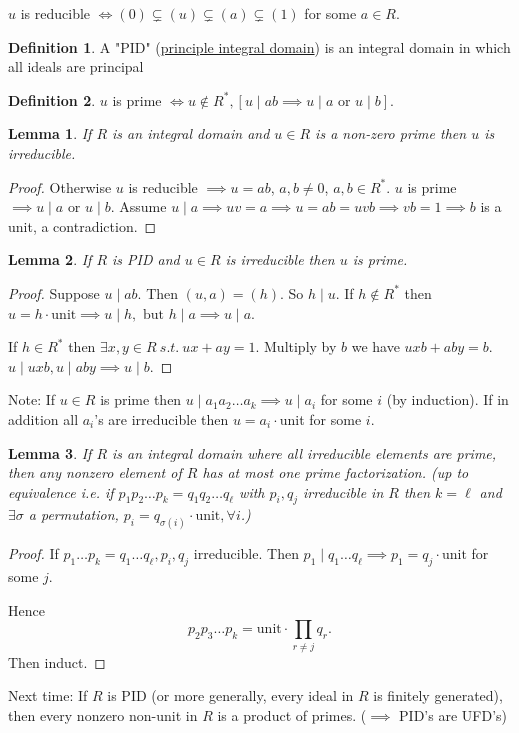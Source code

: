 \documentclass{article}
\newcommand{\st}{\ s.t.\ }
\newtheorem*{lemma}{Lemma}
\theoremstyle{definition}
\newtheorem*{definition}{Definition}
\theoremstyle{remark}
\begin{document}
$u$ is reducible $\iff (0) \subsetneq (u) \subsetneq (a) \subsetneq (1)$ for some $a \in R$.

\begin{definition}
    A "PID" (\underline{principle integral domain}) is an integral domain in which all ideals are principal
\end{definition}

\begin{definition}
    $u$ is prime $\iff u \notin R^*, \left[u \mid ab \implies u \mid a \text{ or } u \mid b\right]$.
\end{definition}

\begin{lemma}
    If $R$ is an integral domain and $u \in R$ is a non-zero prime then $u$ is irreducible.
\end{lemma}
\begin{proof}
    Otherwise $u$ is reducible $\implies u = ab$, $a, b \neq 0$, $a, b \in R^*$. $u$ is prime $\implies u \mid a \text{ or } u \mid b$. Assume $u \mid a \implies uv = a \implies u = ab = uvb \implies vb = 1 \implies b$ is a unit, a contradiction.
\end{proof}

\begin{lemma}
    If $R$ is PID and $u \in R$ is irreducible then $u$ is prime.
\end{lemma}
\begin{proof}
    Suppose $u \mid ab$. Then $(u, a) = (h)$. So $h \mid u$. If $h \notin R^*$ then $u = h \cdot \text{unit} \implies u \mid h, \text{ but } h \mid a \implies u \mid a$.

    If $h \in R^*$ then $\exists x, y \in R \st ux + ay = 1$. Multiply by $b$ we have $uxb + aby = b$. $u \mid uxb, u \mid aby \implies u \mid b$.
\end{proof}
Note: If $u \in R$ is prime then $u \mid a_1a_2 \ldots a_k \implies u \mid a_i$ for some $i$ (by induction). If in addition all $a_i$'s are irreducible then $u = a_i \cdot$unit for some $i$.

\begin{lemma}
    If $R$ is an integral domain where all irreducible elements are prime, then any nonzero element of $R$ has at most one prime factorization. (up to equivalence i.e. if $p_1p_2\ldots p_k = q_1q_2\ldots q_\ell$ with $p_i, q_j$ irreducible in $R$ then $k = \ell$ and $\exists \sigma$ a permutation, $p_i = q_{\sigma(i)} \cdot \text{unit}, \forall i$.)
\end{lemma}
\begin{proof}
    If $p_1\ldots p_k = q_1 \ldots q_\ell, p_i, q_j$ irreducible. Then $p_1 \mid q_1 \ldots q_\ell \implies p_1 = q_j \cdot \text{unit}$ for some $j$.

    Hence \[p_2p_3\ldots p_k = \text{unit} \cdot \prod_{r \neq j} q_r.\]
    Then induct.
\end{proof}
Next time: If $R$ is PID (or more generally, every ideal in $R$ is finitely generated), then every nonzero non-unit in $R$ is a product of primes. ($\implies$ PID's are UFD's)
\end{document}
